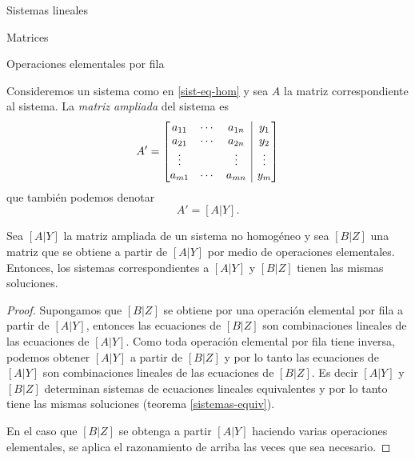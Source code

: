 \begin{chapter}{Sistemas lineales}
\begin{section}{Matrices}
\begin{subsection}{Operaciones elementales por fila}
                \begin{definicion}
                    Consideremos un sistema como en \eqref{sist-eq-hom} y sea  $A$ la matriz correspondiente al sistema. La \textit{matriz  ampliada} del sistema es 
                    \begin{equation}\label{mtrx-ampliada}
                    A' = \left[\begin{array}{@{}*{3}{c}|c@{}}
                    a_{11} & \cdots & a_{1n} &  y_1 \\
                    a_{21} & \cdots & a_{2n} &  y_2 \\
                    \vdots &  & \vdots  &  \vdots  \\
                    a_{m1} & \cdots & a_{mn} &  y_m 
                    \end{array}\right]
                    \end{equation}
                    que también podemos denotar
                    \begin{equation*}
                    A' = [A | Y].
                    \end{equation*}
                \end{definicion}
                
                
                \begin{teorema}\label{th-equiv-op-elem} Sea $[A | Y]$ la matriz ampliada de un sistema no homogéneo y sea $[B | Z]$ una matriz que se obtiene a partir de $[A | Y]$ por medio de operaciones elementales. Entonces, los sistemas correspondientes a $[A | Y]$ y  $[B | Z]$ tienen las mismas soluciones. 
            \end{teorema}
            \begin{proof}
                 Supongamos que $[B | Z]$ se obtiene por una operación elemental por fila a partir de $[A | Y]$,  entonces las ecuaciones de $[B | Z]$ son combinaciones lineales de las ecuaciones de $[A | Y]$. Como toda operación elemental por fila tiene inversa, podemos obtener $[A | Y]$ a partir de $[B | Z]$ y por lo tanto las ecuaciones de $[A | Y]$ son combinaciones lineales de las ecuaciones de $[B | Z]$. Es decir $[A | Y]$ y $[B | Z]$ determinan sistemas de ecuaciones lineales equivalentes y por lo tanto tiene las mismas soluciones (teorema \ref{sistemas-equiv}).
                 
                 En el caso que $[B | Z]$ se obtenga a partir $[A | Y]$ haciendo varias operaciones elementales,  se aplica el razonamiento de arriba las veces que sea necesario. 
            \end{proof}
                

\end{subsection}
\end{section}
\end{chapter}
